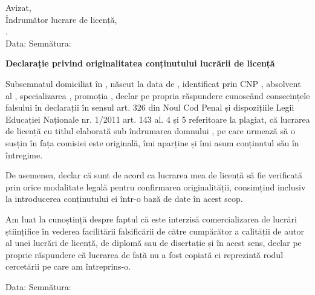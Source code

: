 \vspace*{\fill}

\begin{flushright}
    Avizat, \\
    Îndrumător lucrare de licență, \\
    \coordinator. \\
    Data: \dottedline \hspace{1cm} Semnătura: \dottedline
\end{flushright}

\vspace{1cm}
\begin{center}
    \large
    \textbf{Declarație privind originalitatea conținutului lucrării de licență}
\end{center}

Subsemnatul \textbf{\authornamelf} domiciliat în \textbf{\authoraddress}, născut la data de \textbf{\authorbirth}, identificat prin 
CNP \textbf{\authorcnp}, absolvent al \facultyg, \textbf{\faculty} specializarea \textbf{\speciality}, promoția \promotion, declar 
pe propria răspundere cunoscând consecințele falsului în declarații în sensul art. 326 din Noul Cod Penal și dispozițiile Legii Educației 
Naționale nr. 1/2011 art. 143 al. 4 și 5 referitoare la plagiat, că lucrarea de licență cu titlul \textbf{\thesistitle} elaborată sub 
îndrumarea domnului \textbf{\coordinator}, pe care urmează să o susțin în fața comisiei este originală, îmi aparține și îmi asum 
conținutul său în întregime.

De asemenea, declar că sunt de acord ca lucrarea mea de licență să fie verificată prin orice modalitate legală pentru confirmarea 
originalității, consimțind inclusiv la introducerea conținutului ei într-o bază de date în acest scop.

Am luat la cunoștință despre faptul că este interzisă comercializarea de lucrări științifice în vederea facilitării falsificării de 
către cumpărător a calității de autor al unei lucrări de licență, de diplomă sau de disertație și în acest sens, declar pe proprie 
răspundere că lucrarea de față nu a fost copiată ci reprezintă rodul cercetării pe care am întreprins-o.

\begin{flushright}
    Data: \dottedline \hspace{6cm} Semnătura: \dottedline
\end{flushright}

\vspace*{\fill}
\pagebreak